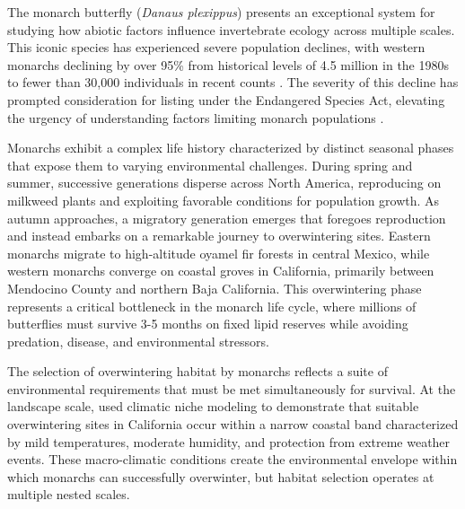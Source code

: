 
The monarch butterfly (\textit{Danaus plexippus}) presents an exceptional system for studying how abiotic factors influence invertebrate ecology across multiple scales. This iconic species has experienced severe population declines, with western monarchs declining by over 95\% from historical levels of 4.5 million in the 1980s to fewer than 30,000 individuals in recent counts \citep{schultzCitizenScienceMonitoring2017a, peltonWesternMonarchPopulation2019}. The severity of this decline has prompted consideration for listing under the Endangered Species Act, elevating the urgency of understanding factors limiting monarch populations \citep{croneWhyAreMonarch2019}.

Monarchs exhibit a complex life history characterized by distinct seasonal phases that expose them to varying environmental challenges. During spring and summer, successive generations disperse across North America, reproducing on milkweed plants and exploiting favorable conditions for population growth. As autumn approaches, a migratory generation emerges that foregoes reproduction and instead embarks on a remarkable journey to overwintering sites. Eastern monarchs migrate to high-altitude oyamel fir forests in central Mexico, while western monarchs converge on coastal groves in California, primarily between Mendocino County and northern Baja California. This overwintering phase represents a critical bottleneck in the monarch life cycle, where millions of butterflies must survive 3-5 months on fixed lipid reserves while avoiding predation, disease, and environmental stressors.


The selection of overwintering habitat by monarchs reflects a suite of environmental requirements that must be met simultaneously for survival. At the landscape scale, \citet{fisherClimaticNicheModel2018} used climatic niche modeling to demonstrate that suitable overwintering sites in California occur within a narrow coastal band characterized by mild temperatures, moderate humidity, and protection from extreme weather events. These macro-climatic conditions create the environmental envelope within which monarchs can successfully overwinter, but habitat selection operates at multiple nested scales.

